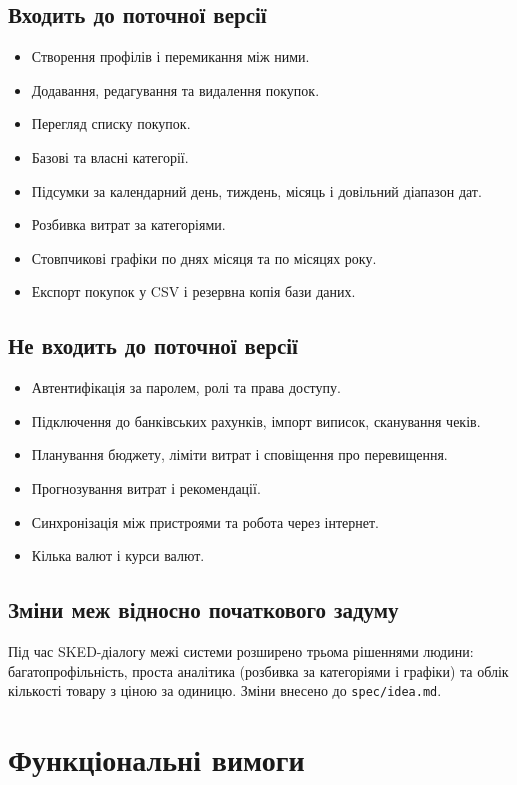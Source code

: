 \documentclass[12pt,a4paper]{article}
\begin{document}
\subsection{Входить до поточної версії}
\begin{itemize}
  \item Створення профілів і перемикання між ними.
  \item Додавання, редагування та видалення покупок.
  \item Перегляд списку покупок.
  \item Базові та власні категорії.
  \item Підсумки за календарний день, тиждень, місяць і довільний діапазон дат.
  \item Розбивка витрат за категоріями.
  \item Стовпчикові графіки по днях місяця та по місяцях року.
  \item Експорт покупок у CSV і резервна копія бази даних.
\end{itemize}

\subsection{Не входить до поточної версії}
\begin{itemize}
  \item Автентифікація за паролем, ролі та права доступу.
  \item Підключення до банківських рахунків, імпорт виписок, сканування чеків.
  \item Планування бюджету, ліміти витрат і сповіщення про перевищення.
  \item Прогнозування витрат і рекомендації.
  \item Синхронізація між пристроями та робота через інтернет.
  \item Кілька валют і курси валют.
\end{itemize}

\subsection{Зміни меж відносно початкового задуму}
Під час SKED-діалогу межі системи розширено трьома рішеннями людини: багатопрофільність,
проста аналітика (розбивка за категоріями і графіки) та облік кількості товару з ціною за одиницю.
Зміни внесено до \texttt{spec/idea.md}.

\section{Функціональні вимоги}
\end{document}
